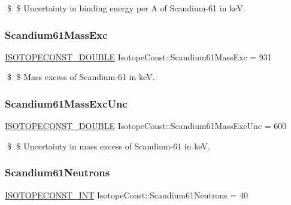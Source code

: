 \$ \$ Uncertainty in binding energy per A of Scandium-\/61 in keV. \mbox{\label{group___isotope_const-_scandium-_sc61_gabae15a655a417d2402a985e17d57590c}} 
\subsubsection{\texorpdfstring{Scandium61\+Mass\+Exc}{Scandium61MassExc}}
{\footnotesize\ttfamily \mbox{\hyperlink{group___isotope_const-_macros_ga8f45a7272ce02c0b4c65c44636ed719a}{I\+S\+O\+T\+O\+P\+E\+C\+O\+N\+S\+T\+\_\+\+D\+O\+U\+B\+LE}} Isotope\+Const\+::\+Scandium61\+Mass\+Exc = 931}

\$ \$ Mass excess of Scandium-\/61 in keV. \mbox{\label{group___isotope_const-_scandium-_sc61_ga46a14abac26ddc05532071ecec5428f4}} 
\subsubsection{\texorpdfstring{Scandium61\+Mass\+Exc\+Unc}{Scandium61MassExcUnc}}
{\footnotesize\ttfamily \mbox{\hyperlink{group___isotope_const-_macros_ga8f45a7272ce02c0b4c65c44636ed719a}{I\+S\+O\+T\+O\+P\+E\+C\+O\+N\+S\+T\+\_\+\+D\+O\+U\+B\+LE}} Isotope\+Const\+::\+Scandium61\+Mass\+Exc\+Unc = 600}

\$ \$ Uncertainty in mass excess of Scandium-\/61 in keV. \mbox{\label{group___isotope_const-_scandium-_sc61_ga72674bbcf1a0c69a33a05f1c0ea682df}} 
\subsubsection{\texorpdfstring{Scandium61\+Neutrons}{Scandium61Neutrons}}
{\footnotesize\ttfamily \mbox{\hyperlink{group___isotope_const-_macros_ga5f18360b3e99483a35c32d789e62621c}{I\+S\+O\+T\+O\+P\+E\+C\+O\+N\+S\+T\+\_\+\+I\+NT}} Isotope\+Const\+::\+Scandium61\+Neutrons = 40}


